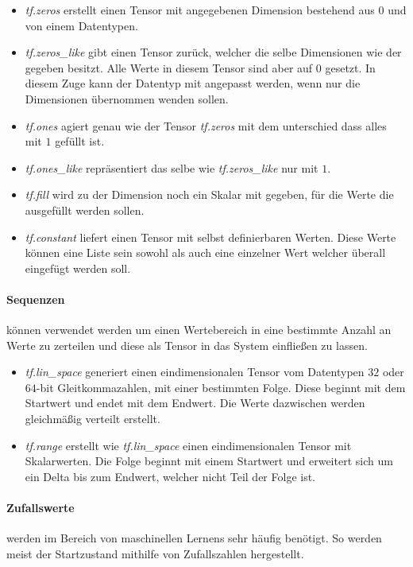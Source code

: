 \begin{itemize}
	\item \textit{tf.zeros} erstellt einen Tensor mit angegebenen Dimension bestehend aus $0$ und von einem Datentypen. 
	\item \textit{tf.zeros\_like} gibt einen Tensor zurück, welcher die selbe Dimensionen wie der gegeben besitzt.
	Alle Werte in diesem Tensor sind aber auf $0$ gesetzt.
	In diesem Zuge kann der Datentyp mit angepasst werden, wenn nur die Dimensionen übernommen wenden sollen.
	\item \textit{tf.ones} agiert genau wie der Tensor \textit{tf.zeros} mit dem unterschied dass alles mit $1$ gefüllt ist.
	\item \textit{tf.ones\_like} repräsentiert das selbe wie \textit{tf.zeros\_like} nur mit $1$.
	\item \textit{tf.fill} wird zu der Dimension noch ein Skalar mit gegeben, für die Werte die ausgefüllt werden sollen.
	\item \textit{tf.constant} liefert einen Tensor mit selbst definierbaren Werten. 
	Diese Werte können eine Liste sein sowohl als auch eine einzelner Wert welcher überall eingefügt werden soll. 
\end{itemize}

\paragraph{Sequenzen} können verwendet werden um einen Wertebereich in eine bestimmte Anzahl an Werte zu zerteilen und diese als Tensor in das System einfließen zu lassen.

\begin{itemize}
	\item \textit{tf.lin\_space} generiert einen eindimensionalen Tensor vom Datentypen $32$ oder $64$-bit Gleitkommazahlen, mit einer bestimmten Folge.
	Diese beginnt mit dem Startwert und endet mit dem Endwert. 
	Die Werte dazwischen werden gleichmäßig verteilt erstellt. 
	\item \textit{tf.range} erstellt wie \textit{tf.lin\_space} einen eindimensionalen Tensor mit Skalarwerten. 
	Die Folge beginnt mit einem Startwert und erweitert sich um ein Delta bis zum Endwert, welcher nicht Teil der Folge ist. 
\end{itemize}

\paragraph{Zufallswerte} werden im Bereich von maschinellen Lernens sehr häufig benötigt. 
So werden meist der Startzustand mithilfe von Zufallszahlen hergestellt. 

